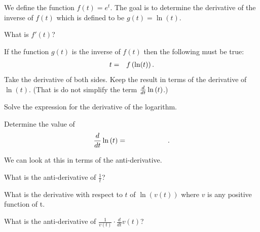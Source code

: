 \begin{problem}

\item We define the function $f(t)=e^t$. The goal is to determine the
  derivative of the inverse of $f(t)$ which is defined to be $g(t)=\ln(t)$.
  \begin{subproblem}
  \item What is $f'(t)$?
    \vspace{2em}
  \item If the function $g(t)$ is the inverse of $f(t)$ then the following must be true:
    \begin{eqnarray*}
      t & = & f\left(\ln (t) \right).
    \end{eqnarray*}
    Take the derivative of both sides.  Keep the result in terms of the derivative of $\ln(t)$.  (That is do not simplify the term
    $\frac{d}{dt} \ln\left( t \right)$.)
    \vfill
  \item Solve the expression for the derivative of the logarithm.
    \vfill
  \item Determine the value of 
  \begin{eqnarray*}
    \frac{d}{dt} \ln\left( t \right) & = & \hspace{5em}.
  \end{eqnarray*}
  \end{subproblem}

\clearpage

\item We can look at this in terms of the anti-derivative.
\begin{subproblem}
    \item What is the anti-derivative of $\frac{1}{t}$?
      \vfill
    \item What is the derivative with respect to $t$ of $\ln(v(t))$ where $v$ is any positive function of t.
      \vfill
    \item What is the anti-derivative of $\frac{1}{v(t)}\cdot \frac{d}{dt} v(t)$?
      \vfill
\end{subproblem}

\clearpage


\end{problem}
